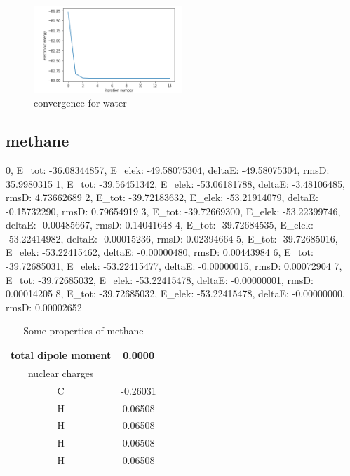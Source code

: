 \begin{figure}
    \centering
    \includegraphics[width=0.5\textwidth]{content/Capture.PNG}
    \caption{convergence for water}
    \label{fig:convergence1}

\end{figure}
\subsection{methane}
\label{subsec:methane}
 
\begin{python}[caption={iterations for methane},label={ls:Listing 8},basicstyle=\scriptsize]
0, E_tot: -36.08344857, E_elek: -49.58075304, deltaE: -49.58075304, rmsD:  35.9980315
1, E_tot: -39.56451342, E_elek: -53.06181788, deltaE: -3.48106485, rmsD:  4.73662689
2, E_tot: -39.72183632, E_elek: -53.21914079, deltaE: -0.15732290, rmsD:  0.79654919
3, E_tot: -39.72669300, E_elek: -53.22399746, deltaE: -0.00485667, rmsD:  0.14041648
4, E_tot: -39.72684535, E_elek: -53.22414982, deltaE: -0.00015236, rmsD:  0.02394664
5, E_tot: -39.72685016, E_elek: -53.22415462, deltaE: -0.00000480, rmsD:  0.00443984
6, E_tot: -39.72685031, E_elek: -53.22415477, deltaE: -0.00000015, rmsD:  0.00072904
7, E_tot: -39.72685032, E_elek: -53.22415478, deltaE: -0.00000001, rmsD:  0.00014205
8, E_tot: -39.72685032, E_elek: -53.22415478, deltaE: -0.00000000, rmsD:  0.00002652
\end{python}
 
 \begin{table}[ht]
    \centering
    \begin{tabular}{c|c}
         total dipole moment & 0.0000  \\
         \hline
         nuclear charges &  \\ 
         \hline
         C & -0.26031 \\
         H & 0.06508 \\
         H & 0.06508 \\
         H & 0.06508\\
         H & 0.06508 \\
    \end{tabular}
    \caption{Some properties of methane}
    \label{tab:number2}
\end{table}

